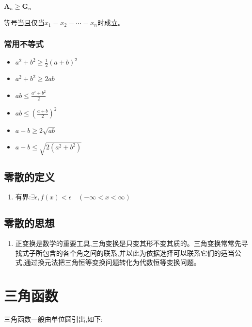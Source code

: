 \documentclass[UTF8]{ctexbook}
\begin{document}
{{{{  \begin{center}
    $\mathbf{A}_n\geq\mathbf{G}_n$
  \end{center}

  等号当且仅当$x_1 = x_2 = \dotsm = x_n$时成立。

}%

\subsubsection{常用不等式}{
  \begin{itemize}
    \item $a^2 + b^2 \geq \frac{1}{2}(a + b)^2$
    \item $a^2 + b^2 \geq 2ab$
    \item $ab \leq \frac{a^2 + b^2}{2}$
    \item $ab \leq (\frac{a + b}{2})^2$
    \item $a + b \geq 2\sqrt{ab}$
    \item $a + b \leq \sqrt{2(a^2 + b^2)}$
  \end{itemize}
}%

}%

\subsection{零散的定义}{
  \begin{enumerate}
    \item 有界:$\exists\epsilon,f(x) < \epsilon\quad(-\infty < x < \infty )$
  \end{enumerate}
}%

\subsection{零散的思想}{
  \begin{enumerate}
    \item 正变换是数学的重要工具,三角变换是只变其形不变其质的。三角变换常常先寻找式子所包含的各个角之间的联系,并以此为依据选择可以联系它们的适当公式,通过换元法把三角恒等变换问题转化为代数恒等变换问题。
  \end{enumerate}
}%

}%

\section{三角函数}{
三角函数一般由单位圆引出,如下:

}}
\end{document}

